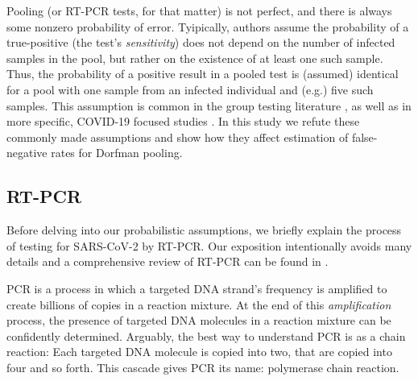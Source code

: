\documentclass{article}
\begin{document}
Pooling (or RT-PCR tests, for that matter) is not perfect, and there
is always some nonzero probability of error. Tyipically, authors
assume the probability of a true-positive (the test's
\emph{sensitivity}) does not depend on the number of infected samples
in the pool, but rather on the existence of at least one such
sample. Thus, the probability of a positive result in a pooled test is
(assumed) identical for a pool with one sample from an infected
individual and (e.g.) five such samples. This assumption is common in
the group testing literature \cite{Kim, OptimalDorfmanPool}, as well
as in more specific, COVID-19 focused studies \cite{Simplistic1,
  Simplistic2}. In this study we refute these commonly made
assumptions and show how they affect estimation of false-negative
rates for Dorfman pooling.



\subsection{RT-PCR}
Before delving into our probabilistic assumptions, we briefly explain
the process of testing for SARS-CoV-2 by RT-PCR. Our exposition
intentionally avoids many details and a comprehensive review of RT-PCR
can be found in \cite{COVID-RTPCR, PCRBook}.

PCR is a process in which a targeted DNA strand's frequency is
amplified to create billions of copies in a reaction mixture. At the
end of this \emph{amplification} process, the presence of targeted DNA
molecules in a reaction mixture can be confidently
determined. Arguably, the best way to understand PCR is as a chain
reaction: Each targeted DNA molecule is copied into two, that are
copied into four and so forth. This cascade gives PCR its name:
polymerase chain reaction.
\end{document}
